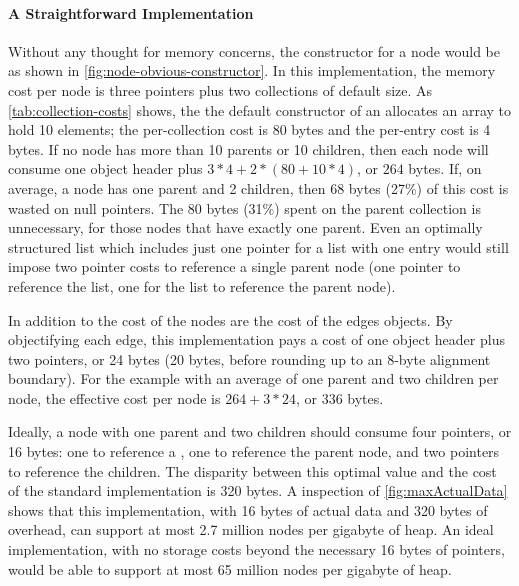 \paragraph{A Straightforward Implementation}
Without any thought for memory concerns, the constructor for a node would be as
shown in \autoref{fig:node-obvious-constructor}. In this implementation, the
memory cost per node is three pointers plus two collections of default size. As
\autoref{tab:collection-costs} shows, the the default constructor of an
 allocates an array to hold 10 elements; the per-collection cost
is 80 bytes and the per-entry cost is 4 bytes. If no node has more than 10
parents or 10 children, then each node will consume one object header plus $3*4 +
2*(80 + 10*4)$, or $264$ bytes. If, on average, a node has one parent and 2
children, then 68 bytes (27\%) of this cost is wasted on null pointers. The 80
bytes (31\%) spent on the parent collection is unnecessary, for those nodes that
have exactly one parent. Even an optimally structured list which includes just
one pointer for a list with one entry would still impose two pointer costs to
reference a single parent node (one pointer to reference the list, one for the
list to reference the parent node).

In addition to the cost of the nodes are the cost of the edges objects. By
objectifying each edge, this implementation pays a cost of one object header
plus two pointers, or 24 bytes (20 bytes, before rounding up to an 8-byte
alignment boundary). For the example with an average of one parent and two
children per node, the effective cost per node is $264 + 3*24$, or $336$ bytes.

Ideally, a node with one parent and two children should consume four pointers, or
16 bytes: one to reference a , one to reference the parent node, and
two pointers to reference the children. The disparity between this optimal value
and the cost of the standard implementation is 320 bytes. A inspection of
\autoref{fig:maxActualData} shows that this implementation, with 16 bytes of
actual data and 320 bytes of overhead, can support at most 2.7 million nodes per
gigabyte of heap. An ideal implementation, with no storage costs beyond the
necessary 16 bytes of pointers, would be able to support at most 65 million nodes
per gigabyte of heap.

